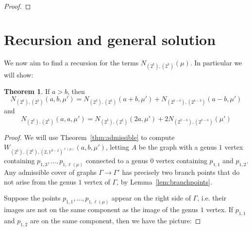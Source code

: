 \documentclass[thesis]{thesis-umich}           %
\theoremstyle{definition}
\newtheorem{thm}{Theorem}[section]
\begin{document}
\begin{proof}
\end{proof}

\section{Recursion and general solution}

We now aim to find a recursion for the terms $N_{(2^k),(2^k)}(\mu)$. In particular we will show:

\begin{thm}
  If $a>b$, then
  \[
  N_{(2^k),(2^k)}(a,b,\mu')=N_{(2^k),(2^k)}(a+b,\mu')+N_{(2^{k-b}),(2^{k-b})}(a-b,\mu')
  \]
  and
  \[
  N_{(2^k),(2^k)}(a,a,\mu')=N_{(2^k),(2^k)}(2a,\mu')+2N_{(2^{k-a}),(2^{k-a})}(\mu')
  \]
  \end{thm}
\begin{proof}
  We will use Theorem~\ref{thm:admissible} to compute $W_{(2^k),(2^k),(2,1^{d-2})^{\ell(\mu)}}(a,b,\mu')$,
  letting $A$ be the graph with a genus $1$ vertex containing
  $p_{1,3},\dots,p_{1,\ell(\mu)}$ connected to a genus $0$ vertex containing $p_{1,1}$ and $p_{1,2}$.
  Any admissible cover of graphs $\Gamma\to\Gamma'$ has precisely two branch points that do
  not arise from the genus $1$ vertex of $\Gamma$, by Lemma~\ref{lem:branchpoints}.

  Suppose the points $p_{1,1},\dots,p_{1,\ell(\mu)}$ appear on the right side of $\Gamma$, i.e.
  their images are not on the same component as the image of the genus $1$ vertex. If
  $p_{1,1}$ and $p_{1,2}$ are on the same component, then we have the picture:

\end{proof}
\end{document}

